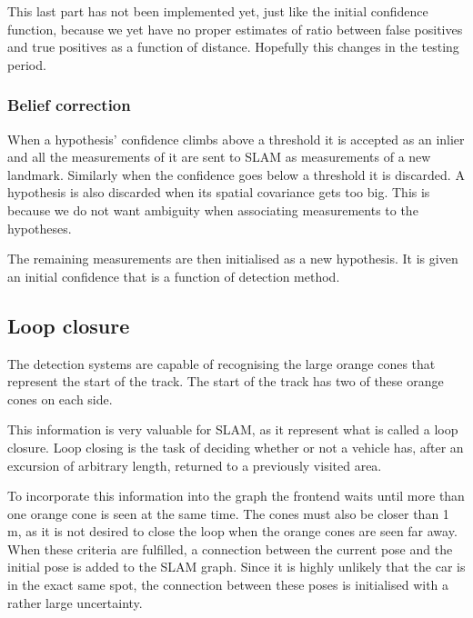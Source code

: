 This last part has not been implemented yet, just like the initial confidence function, because we yet have no proper estimates of ratio between false positives and true positives as a function of distance. Hopefully this changes in the testing period.

\subsubsection{Belief correction}

When a hypothesis' confidence climbs above a threshold it is accepted as an inlier and all the measurements of it are sent to SLAM as measurements of a new landmark. Similarly when the confidence goes below a threshold it is discarded. A hypothesis is also discarded when its spatial covariance gets too big. This is because we do not want ambiguity when associating measurements to the hypotheses. 

The remaining measurements are then initialised as a new hypothesis. It is given an initial confidence that is a function of detection method.


\subsection{Loop closure}

The detection systems are capable of recognising the large orange cones that represent the start of the track. The start of the track has two of these orange cones on each side. 

This information is very valuable for \gls{SLAM}, as it represent what is called a loop closure. Loop closing is the task of deciding whether or not a vehicle has, after an excursion of arbitrary length, returned to a previously visited area.  

To incorporate this information into the graph the frontend waits until more than one orange cone is seen at the same time. The cones must also be closer than 1 \si{\metre}, as it is not desired to close the loop when the orange cones are seen far away. When these criteria are fulfilled, a connection between the current pose and the initial pose is added to the \gls{SLAM} graph. Since it is highly unlikely that the car is in the exact same spot, the connection between these poses is initialised with a rather large uncertainty.